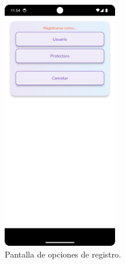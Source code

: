 \documentclass[a4paper, 12pt]{article}
\begin{document}
\begin{figure}[H]
	\begin{center}
		{\includegraphics[width=5cm]{app/Register.png}\par}
		\caption{Pantalla de opciones de registro.}
	\end{center}  
\end{figure}
\end{document}
